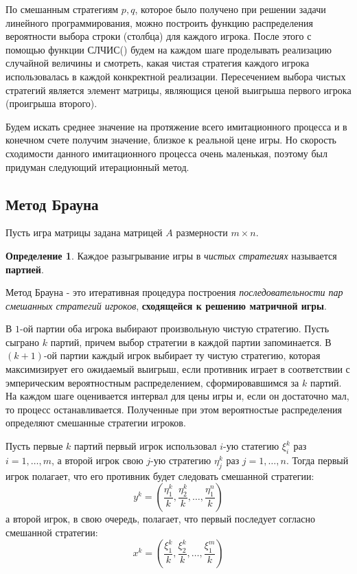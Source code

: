 \documentclass[aps,%
12pt,%
final,%
oneside,
onecolumn,%
musixtex, %
superscriptaddress,%
centertags]{article} %
\theoremstyle{plain}
\theoremstyle{definition}
\newtheorem{definition}{Определение}[subsection]
\theoremstyle{remark}
\begin{document}
По смешанным стратегиям $p,q$, которое было получено при решении задачи линейного программирования, можно построить функцию распределения вероятности выбора строки (столбца) для каждого игрока. После этого с помощью функции \textsc{СЛЧИС()} будем на каждом шаге проделывать реализацию случайной величины и смотреть, какая чистая стратегия каждого игрока использовалась в каждой конкректной реализации. Пересечением выбора чистых стратегий является элемент матрицы, являющися ценой выигрыша первого игрока (проигрыша второго).

Будем искать среднее значение на протяжение всего имитационного процесса и в конечном счете получим значение, близкое к реальной цене игры. Но скорость сходимости данного имитационного процесса очень маленькая, поэтому был придуман следующий итерационный метод.

\newpage
\subsection{Метод Брауна}

Пусть игра матрицы задана матрицей $A$ размерности $m \times n$. 

\begin{definition}
  Каждое разыгрывание игры в \textit{чистых стратегиях} называется \textbf{партией}.
\end{definition}

Метод Брауна - это итеративная процедура построения \textit{последовательности пар смешанных стратегий игроков}, \textbf{сходящейся к решению матричной игры}.

В $1$-ой партии оба игрока выбирают произвольную чистую стратегию. Пусть сыграно $k$ партий, причем выбор стратегии в каждой партии запоминается. В $(k+1)$-ой партии каждый игрок выбирает ту чистую стратегию, которая максимизирует его ожидаемый выигрыш, если противник играет в соответствии с эмперическим вероятностным распределением, сформировавшимся за $k$ партий. На каждом шаге оценивается интервал для цены игры и, если он достаточно мал, то процесс останавливается. Полученные при этом вероятностые распределения определяют смешанные стратегии игроков.

Пусть первые $k$ партий первый игрок использовал $i$-ую статегию $\xi_i^k$ раз $i=1,\ldots,m$, а второй игрок свою $j$-ую стратегию $\eta_j^k$ раз $j=1,\ldots,n$. Тогда первый игрок полагает, что его противник будет следовать смешанной стратегии:
$$y^k = \left(\frac{\eta_1^k}{k},\frac{\eta_2^k}{k}, \ldots,\frac{\eta_1^n}{k}\right)$$
а второй игрок, в свою очередь, полагает, что первый последует согласно смешанной стратегии:
$$x^k = \left(\frac{\xi_1^k}{k},\frac{\xi_2^k}{k}, \ldots,\frac{\xi_1^m}{k}\right)$$
\end{document}
